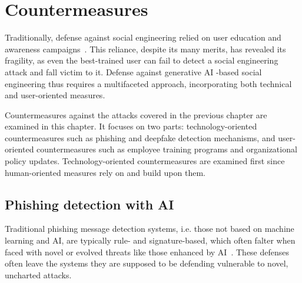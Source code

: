 

\chapter{Countermeasures\label{chapter:countermeasures}}

Traditionally, defense against social engineering relied on user education and awareness campaigns~\citep{fakhouri_AI_Driven_Solutions_SE_Attacks_2024}. This reliance, despite its many merits, has revealed its fragility, as even the best-trained user can fail to detect a social engineering attack and fall victim to it. Defense against generative AI -based social engineering thus requires a multifaceted approach, incorporating both technical and user-oriented measures.

Countermeasures against the attacks covered in the previous chapter are examined in this chapter. It focuses on two parts: technology-oriented countermeasures such as phishing and deepfake detection mechanisms, and user-oriented countermeasures such as employee training programs and organizational policy updates. Technology-oriented countermeasures are examined first since human-oriented measures rely on and build upon them.



\section{Phishing detection with AI}

Traditional phishing message detection systems, i.e. those not based on machine learning and AI, are typically rule- and signature-based, which often falter when faced with novel or evolved threats like those enhanced by AI~\citep{fakhouri_AI_Driven_Solutions_SE_Attacks_2024}. These defenses often leave the systems they are supposed to be defending vulnerable to novel, uncharted attacks.

